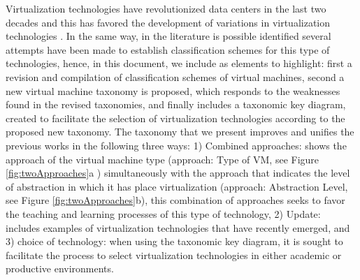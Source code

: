 	 
	
	
	
	
	
    Virtualization technologies have revolutionized data centers in the last two decades and this has favored the development of variations in virtualization technologies \cite{Kampert2010}. In the same way, in the literature is possible identified several attempts have been made to establish classification schemes for this type of technologies, hence, in this document, we include as elements to highlight: first a revision and compilation of classification schemes of virtual machines, second a new virtual machine taxonomy is proposed, which responds to the weaknesses found in the revised taxonomies, and finally includes a taxonomic key diagram, created to facilitate the selection of virtualization technologies according to the proposed new taxonomy. The taxonomy that we present improves and unifies the previous works in the following three ways: 1) Combined approaches: shows the approach of the virtual machine type (approach: Type of VM, see Figure \ref{fig:twoApproaches}a ) simultaneously with the approach that indicates the level of abstraction in which it has place virtualization (approach: Abstraction Level, see Figure \ref{fig:twoApproaches}b), this combination of approaches seeks to favor the teaching and learning processes of this type of technology, 2) Update: includes examples of virtualization technologies that have recently emerged, and 3) choice of technology: when using the taxonomic key diagram, it is sought to facilitate the process to select virtualization technologies in either academic or productive environments.

